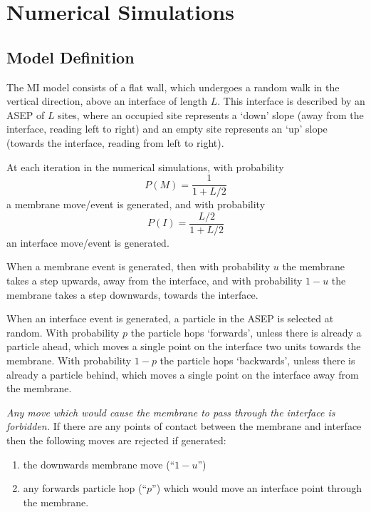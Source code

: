 \documentclass[a4paper,10pt]{article}
\begin{document}
\newpage
\section{Numerical Simulations}

\subsection{Model Definition}

The MI model consists of a flat wall, which undergoes a random walk in the vertical direction, above an interface of length $L$. This interface is described by an ASEP of $L$ sites, where an occupied site represents a `down' slope (away from the interface, reading left to right) and an empty site represents an `up' slope (towards the interface, reading from left to right). 

At each iteration in the numerical simulations, with probability
\begin{equation}
 P(M) = \frac{1}{1 + L/2} 
\end{equation}
a membrane move/event is generated, and with probability
\begin{equation}
 P(I) = \frac{L/2}{1 + L/2} 
\end{equation}
an interface move/event is generated. 

When a membrane event is generated, then with probability $u$ the membrane takes a step upwards, away from the interface, and with probability $1-u$ the membrane takes a step downwards, towards the interface.

When an interface event is generated, a particle in the ASEP is selected at random. With probability $p$ the particle hops `forwards', unless there is already a particle ahead, which moves a single point on the interface two units towards the membrane. With probability $1-p$ the particle hops `backwards', unless there is already a particle behind, which moves a single point on the interface away from the membrane. 

\emph{Any move which would cause the membrane to pass through the interface is forbidden.} If there are any points of contact between the membrane and interface then the following moves are rejected if generated:
\begin{enumerate}
 \item the downwards membrane move (``$1-u$'')
 \item any forwards particle hop (``$p$'') which would move an interface point through the membrane. 
\end{enumerate} 
\end{document}
